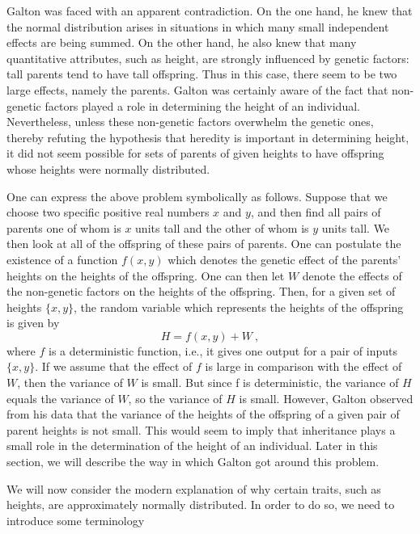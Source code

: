 \par
Galton was faced with an apparent contradiction.  On the one hand, he knew that the normal
distribution arises in situations in which many small independent effects are being summed.  On
the other hand, he also knew that many quantitative attributes, such as height, are strongly
influenced by genetic factors:  tall parents tend to have tall offspring.  Thus in this case,
there seem to be two large effects, namely the parents.  Galton was certainly aware of the fact
that non-genetic factors played a role in determining the height of an individual.  Nevertheless,
unless these non-genetic factors overwhelm the genetic ones, thereby refuting the hypothesis that
heredity is important in determining height, it did not seem possible for sets of parents of
given heights to have offspring whose heights were normally distributed.
\par
One can express the above problem symbolically as follows.  Suppose that we choose two specific
positive real numbers $x$ and $y$, and then find all pairs of parents one of whom is $x$ units tall
and the other of whom is $y$ units tall.  We then look at all of the offspring of these pairs of
parents.  One can postulate the existence of a function $f(x, y)$ which denotes
the genetic effect of the parents' heights on the heights of the offspring.  One can then let $W$
denote the effects of the non-genetic factors on the heights of the offspring.  Then, for a given
set of heights $\{x, y\}$, the random variable which represents the heights of the offspring is
given by 
$$H = f(x, y) + W\ ,$$
where $f$ is a deterministic function, i.e., it gives one output for a pair of inputs $\{x, y\}$.
If we assume that the effect of $f$ is large in comparison with the effect of $W$, then the
variance of $W$ is small.  But since f is deterministic, the variance of $H$ equals the variance
of $W$, so the variance of $H$ is small.  However, Galton observed from his data that the variance
of the heights of the offspring of a given pair of parent heights is not small.  This would
seem to imply that inheritance plays a small role in the determination of the height of an
individual.  Later in this section, we will describe the way in which Galton got around this
problem.  
\par
We will now consider the modern explanation of why certain traits, such as heights, are
approximately normally distributed.  In order to do so, we need to introduce some terminology
